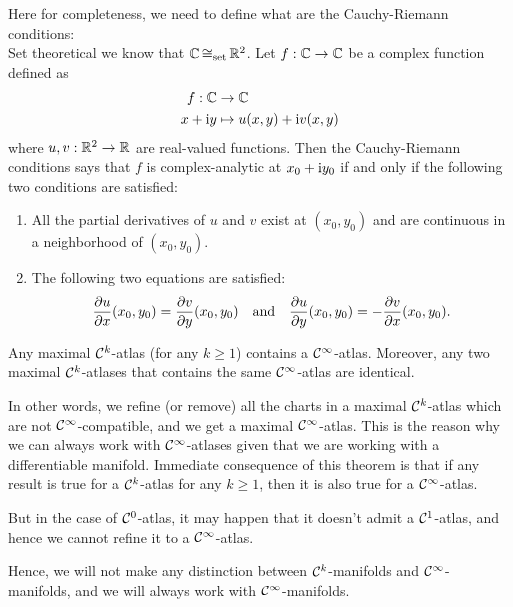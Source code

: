 \noindent Here for completeness, we need to define what are the Cauchy-Riemann conditions:\\
Set theoretical we know that \(\mathbb C \operatorname{\mathrel{\cong_{\text{set}}}} \mathbb R^2\). Let \(f: \mathbb C \to \mathbb C\) be a complex function defined as
\begin{equation}
	\begin{aligned}
		f: \mathbb C    & \to \mathbb C                       \\
		x + \mathrm{i} y & \mapsto u(x, y) + \mathrm{i} v(x, y)
	\end{aligned}
\end{equation}
where \(u, v: \mathbb R^2 \to \mathbb R\) are real-valued functions. Then the Cauchy-Riemann conditions says that \(f\) is complex-analytic at \(x_0 + \mathrm{i} y_0\) if and only if the following two conditions are satisfied:
\begin{enumerate}
	\item All the partial derivatives of \(u\) and \(v\) exist at \((x_0, y_0)\) and are continuous in a neighborhood of \((x_0, y_0)\).
	\item The following two equations are satisfied:
	      \begin{equation}
		      \pdv{u}{x} \qty(x_0, y_0) = \pdv{v}{y} \qty(x_0, y_0) \quad \text{and} \quad \pdv{u}{y} \qty(x_0, y_0) = -\pdv{v}{x} \qty(x_0, y_0).
	      \end{equation}
\end{enumerate}

\begin{theorem}[Whitney]
	Any maximal \(\mathcal C^k\)-atlas (for any \(k \ge 1\)) contains a \(\mathcal C^{\infty}\)-atlas. Moreover, any two maximal \(\mathcal C^k\)-atlases that contains the same \(\mathcal C^{\infty}\)-atlas are identical.
\end{theorem}
In other words, we refine (or remove) all the charts in a maximal \(\mathcal C^k\)-atlas which are not \(\mathcal C^{\infty}\)-compatible, and we get a maximal \(\mathcal C^{\infty}\)-atlas. This is the reason why we can always work with \(\mathcal C^{\infty}\)-atlases given that we are working with a differentiable manifold. Immediate consequence of this theorem is that if any result is true for a \(\mathcal C^k\)-atlas for any \(k \ge 1\), then it is also true for a \(\mathcal C^{\infty}\)-atlas.

But in the case of \(\mathcal C^0\)-atlas, it may happen that it doesn't admit a \(\mathcal C^1\)-atlas, and hence we cannot refine it to a \(\mathcal C^{\infty}\)-atlas.

Hence, we will not make any distinction between \(\mathcal C^k\)-manifolds and \(\mathcal C^{\infty}\)-manifolds, and we will always work with \(\mathcal C^{\infty}\)-manifolds.

